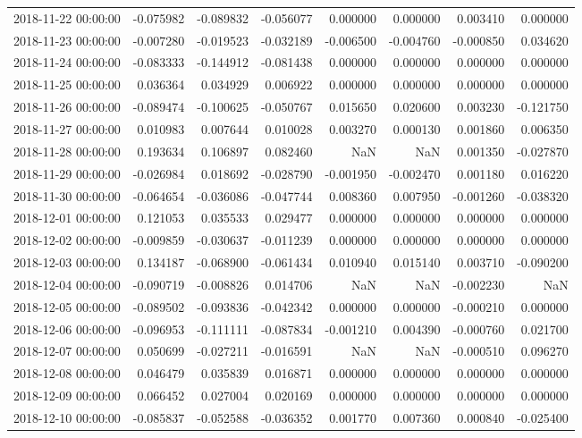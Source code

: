 \begin{tabular}{lrrrrrrr}
2018-11-22 00:00:00 & -0.075982 & -0.089832 & -0.056077 & 0.000000 & 0.000000 & 0.003410 & 0.000000 \\
2018-11-23 00:00:00 & -0.007280 & -0.019523 & -0.032189 & -0.006500 & -0.004760 & -0.000850 & 0.034620 \\
2018-11-24 00:00:00 & -0.083333 & -0.144912 & -0.081438 & 0.000000 & 0.000000 & 0.000000 & 0.000000 \\
2018-11-25 00:00:00 & 0.036364 & 0.034929 & 0.006922 & 0.000000 & 0.000000 & 0.000000 & 0.000000 \\
2018-11-26 00:00:00 & -0.089474 & -0.100625 & -0.050767 & 0.015650 & 0.020600 & 0.003230 & -0.121750 \\
2018-11-27 00:00:00 & 0.010983 & 0.007644 & 0.010028 & 0.003270 & 0.000130 & 0.001860 & 0.006350 \\
2018-11-28 00:00:00 & 0.193634 & 0.106897 & 0.082460 & NaN & NaN & 0.001350 & -0.027870 \\
2018-11-29 00:00:00 & -0.026984 & 0.018692 & -0.028790 & -0.001950 & -0.002470 & 0.001180 & 0.016220 \\
2018-11-30 00:00:00 & -0.064654 & -0.036086 & -0.047744 & 0.008360 & 0.007950 & -0.001260 & -0.038320 \\
2018-12-01 00:00:00 & 0.121053 & 0.035533 & 0.029477 & 0.000000 & 0.000000 & 0.000000 & 0.000000 \\
2018-12-02 00:00:00 & -0.009859 & -0.030637 & -0.011239 & 0.000000 & 0.000000 & 0.000000 & 0.000000 \\
2018-12-03 00:00:00 & 0.134187 & -0.068900 & -0.061434 & 0.010940 & 0.015140 & 0.003710 & -0.090200 \\
2018-12-04 00:00:00 & -0.090719 & -0.008826 & 0.014706 & NaN & NaN & -0.002230 & NaN \\
2018-12-05 00:00:00 & -0.089502 & -0.093836 & -0.042342 & 0.000000 & 0.000000 & -0.000210 & 0.000000 \\
2018-12-06 00:00:00 & -0.096953 & -0.111111 & -0.087834 & -0.001210 & 0.004390 & -0.000760 & 0.021700 \\
2018-12-07 00:00:00 & 0.050699 & -0.027211 & -0.016591 & NaN & NaN & -0.000510 & 0.096270 \\
2018-12-08 00:00:00 & 0.046479 & 0.035839 & 0.016871 & 0.000000 & 0.000000 & 0.000000 & 0.000000 \\
2018-12-09 00:00:00 & 0.066452 & 0.027004 & 0.020169 & 0.000000 & 0.000000 & 0.000000 & 0.000000 \\
2018-12-10 00:00:00 & -0.085837 & -0.052588 & -0.036352 & 0.001770 & 0.007360 & 0.000840 & -0.025400 \\

\end{tabular}
